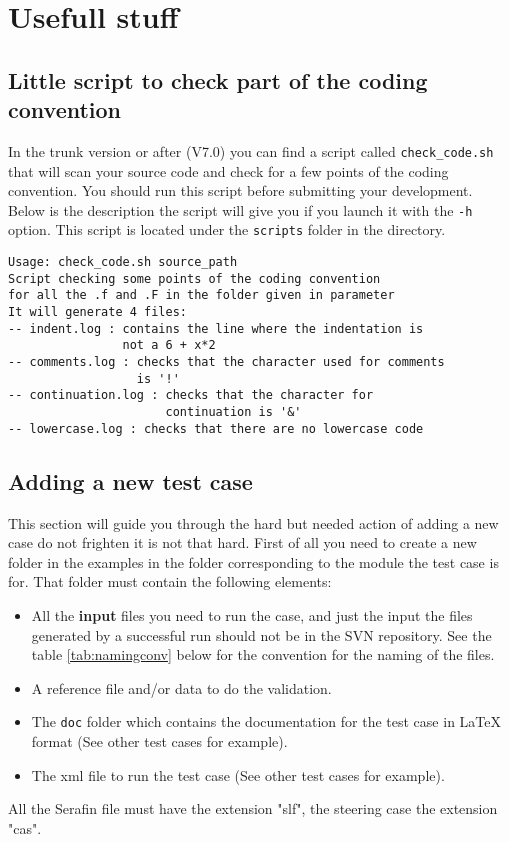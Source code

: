 %
\chapter{Usefull stuff}
%
\section{Little script to check part of the coding convention}
%
In the trunk version or after (V7.0) you can find a script called
\verb!check_code.sh! that will scan your source code and check for a few points
of the coding convention. You should run this script before submitting your
development. Below is the description the script will give you if you launch it
with the \verb!-h! option. This script is located under the \verb!scripts!
folder in the \telemacsystem directory.
\begin{lstlisting}
Usage: check_code.sh source_path
Script checking some points of the coding convention
for all the .f and .F in the folder given in parameter
It will generate 4 files:
-- indent.log : contains the line where the indentation is
                not a 6 + x*2
-- comments.log : checks that the character used for comments
                  is '!'
-- continuation.log : checks that the character for
                      continuation is '&'
-- lowercase.log : checks that there are no lowercase code
\end{lstlisting}

\section{Adding a new test case}
%
This section will guide you through the hard but needed action of adding a new
case do not frighten it is not that hard. First of all you need to create a new
folder in the examples in the folder corresponding to the module the test case
is for. That folder must contain the following elements:
\begin{itemize}
\item All the \textbf{input} files you need to run the case, and just the input
the files generated by a successful run should not be in the SVN repository.
See the table \ref{tab:namingconv} below for the convention for the naming of
the files.
\item A reference file and/or data to do the validation.
\item The \verb!doc! folder which contains the documentation for the test case
in LaTeX format (See other test cases for example).
\item The xml file to run the test case (See other test cases for example).
\end{itemize}
All the Serafin file must have the extension "slf", the steering case the
extension "cas".

